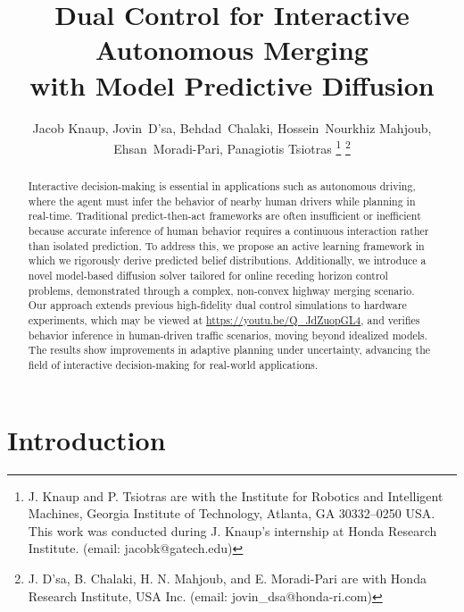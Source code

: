 \documentclass[letterpaper, 10 pt, conference]{IEEEconf}
\title{Dual Control for Interactive Autonomous Merging \\ with Model Predictive Diffusion}
\author{Jacob Knaup,
Jovin~D'sa,
Behdad~Chalaki,
Hossein~Nourkhiz Mahjoub,
Ehsan~Moradi-Pari,
Panagiotis Tsiotras
\thanks{\hangindent=0.5cm J. Knaup and P. Tsiotras are with the Institute for Robotics and Intelligent Machines,
Georgia Institute of Technology,  Atlanta, GA 30332--0250 USA. This work was conducted during J. Knaup's internship at Honda Research Institute. (email: jacobk@gatech.edu)}
\thanks{J. D'sa, B. Chalaki, H. N. Mahjoub, and E. Moradi-Pari are with Honda Research Institute, USA Inc. (email: jovin{\_}dsa@honda-ri.com)}
}
\begin{document}
\maketitle

\begin{abstract}
Interactive decision-making is essential in applications such as autonomous driving, where the agent must infer the behavior of nearby human drivers while planning in real-time. Traditional predict-then-act frameworks are often insufficient or inefficient because accurate inference of human behavior requires a continuous interaction rather than isolated prediction. 
To address this, we propose an active learning framework in which we rigorously derive predicted belief distributions.
Additionally, we introduce a novel model-based diffusion solver tailored for online receding horizon control problems, demonstrated through a complex, non-convex highway merging scenario. 
Our approach extends previous high-fidelity dual control simulations to hardware experiments, which may be viewed at \url{https://youtu.be/Q_JdZuopGL4}, and verifies behavior inference in human-driven traffic scenarios, moving beyond idealized models. 
The results show improvements in adaptive planning under uncertainty, advancing the field of interactive decision-making for real-world applications. 
    
\end{abstract}

\section{Introduction}
\end{document}
